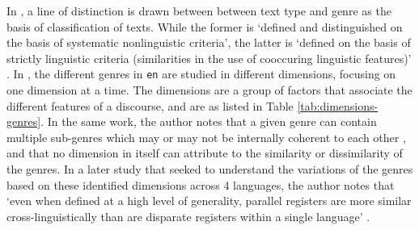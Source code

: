 In \cite{biber2}, a line of distinction is drawn between between text type and genre as the basis of classification of texts. While the former is `defined and distinguished on the basis of systematic nonlinguistic criteria', the latter is `defined on the basis of strictly linguistic criteria (similarities in the use of cooccuring linguistic features)' \cite[p.~39]{biber2}. In \cite{biber}, the different genres in \verb|en| are studied in different dimensions, focusing on one dimension at a time. The dimensions are a group of factors that associate the different features of a discourse, and are as listed in Table \ref{tab:dimensions-genres}. In the same work, the author notes that a given genre can contain multiple sub-genres which may or may not be internally coherent to each other \cite[p.~170]{biber}, and that no dimension in itself can attribute to the similarity or dissimilarity of the genres. In a later study that seeked to understand the variations of the genres based on these identified dimensions across 4 languages, the author notes that `even when defined at a high level of generality, parallel registers are more similar cross-linguistically than are disparate registers within a single language' \cite[p.~279]{biberbook}.

